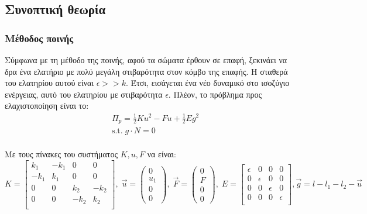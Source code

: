 \documentclass{article}
\begin{document}
\subsection{Συνοπτική θεωρία}
\subsubsection{Μέθοδος ποινής}
Σύμφωνα με τη μέθοδο της ποινής, αφού τα σώματα έρθουν σε επαφή, ξεκινάει να δρα ένα ελατήριο με πολύ μεγάλη στιβαρότητα στον κόμβο της επαφής. Η σταθερά του ελατηρίου αυτού είναι $\epsilon >> k$. Έτσι, εισάγεται ένα νέο δυναμικό στο ισοζύγιο ενέργειας, αυτό του ελατηρίου με στιβαρότητα $\epsilon$. Πλέον, το πρόβλημα προς ελαχιστοποίηση είναι το:
 \begin{align}
    &\Pi_p = \frac{1}{2}Ku^2 - F u + \frac{1}{2}E g ^2\\
    &\text{s.t.}\;  g\cdot N = 0\\
\end{align}

Με τους πίνακες του συστήματος $K, u, F$ να είναι:
\begin{equation}
    K = \begin{bmatrix}
        k_1 &-k_1 & 0 & 0\\
        -k_1 & k_1 & 0 & 0\\
        0 &0 & k_2 & -k_2\\
        0 &0 & -k_2 & k_2\\
    \end{bmatrix},\; \vec{u} = \begin{pmatrix}
        0\\ u_1 \\ 0\\ 0
    \end{pmatrix},\; \vec{F} = \begin{pmatrix}
        0\\ F\\ 0\\0
    \end{pmatrix}, \; E = \begin{bmatrix}
        \epsilon & 0 & 0 & 0\\
        0 & \epsilon & 0 & 0\\
         0 & 0 & \epsilon & 0\\
         0 & 0 & 0 & \epsilon\\
    \end{bmatrix}, \vec{g} = l - l_1 - l_2 - \vec{u}
\end{equation}
\end{document}
